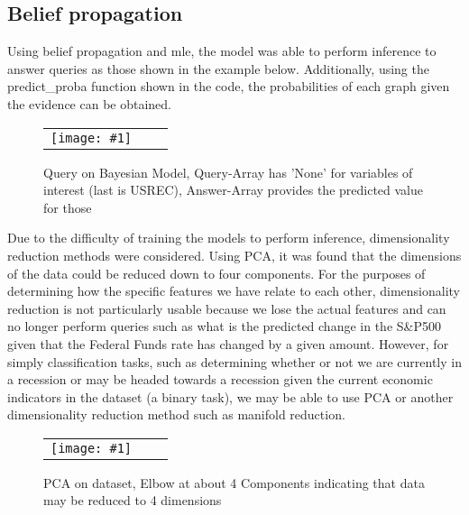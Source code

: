 \documentclass{article}
\begin{document}
\subsection{Belief propagation}

Using belief propagation and mle, the model was able to perform inference to answer queries as those shown in the example below. Additionally, using the predict\_proba function shown in the code, the probabilities of each graph given the evidence can be obtained. 

\begin{figure*}[ht]
   \centering

\newcommand{\photo}[1]{%
    \texttt{[image: \#1]}
}

\begin{tabular}{rcc}
    \photo{Inference_BP} \\
\end{tabular}
	\caption{Query on Bayesian Model, Query-Array has 'None' for variables of interest (last is USREC), Answer-Array provides the predicted value for those}
\end{figure*}

Due to the difficulty of training the models to perform inference, dimensionality reduction methods were considered. Using PCA, it was found that the dimensions of the data could be reduced down to four components. For the purposes of determining how the specific features we have relate to each other, dimensionality reduction is not particularly usable because we lose the actual features and can no longer perform queries such as what is the predicted change in the S\&P500 given that the Federal Funds rate has changed by a given amount. However, for simply classification tasks, such as determining whether or not we are currently in a recession or may be headed towards a recession given the current economic indicators in the dataset (a binary task), we may be able to use PCA or another dimensionality reduction method such as manifold reduction.

\begin{figure*}[ht]
   \centering

\newcommand{\photo}[1]{%
    \texttt{[image: \#1]}
}

\begin{tabular}{rcc}
    \photo{PCA_Elbow} \\
\end{tabular}
	\caption{PCA on dataset, Elbow at about 4 Components indicating that data may be reduced to 4 dimensions}
\end{figure*}
\end{document}
